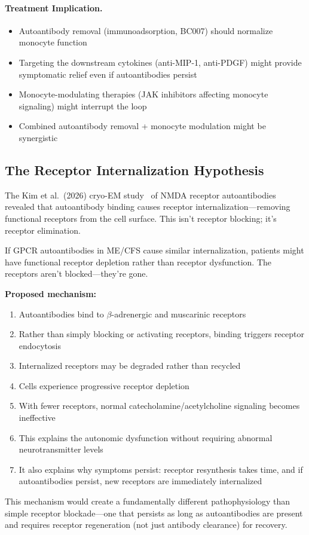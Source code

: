 \paragraph{Treatment Implication.}
\begin{itemize}
    \item Autoantibody removal (immunoadsorption, BC007) should normalize monocyte function
    \item Targeting the downstream cytokines (anti-MIP-1, anti-PDGF) might provide symptomatic relief even if autoantibodies persist
    \item Monocyte-modulating therapies (JAK inhibitors affecting monocyte signaling) might interrupt the loop
    \item Combined autoantibody removal + monocyte modulation might be synergistic
\end{itemize}

\subsection{The Receptor Internalization Hypothesis}

\begin{open_question}
The Kim et al.\ (2026) cryo-EM study~\cite{Kim2026nmdar_cryoem} of NMDA receptor autoantibodies revealed that autoantibody binding causes receptor internalization---removing functional receptors from the cell surface. This isn't receptor blocking; it's receptor elimination.

If GPCR autoantibodies in ME/CFS cause similar internalization, patients might have functional receptor depletion rather than receptor dysfunction. The receptors aren't blocked---they're gone.

\textbf{Proposed mechanism:}
\begin{enumerate}
    \item Autoantibodies bind to $\beta$-adrenergic and muscarinic receptors
    \item Rather than simply blocking or activating receptors, binding triggers receptor endocytosis
    \item Internalized receptors may be degraded rather than recycled
    \item Cells experience progressive receptor depletion
    \item With fewer receptors, normal catecholamine/acetylcholine signaling becomes ineffective
    \item This explains the autonomic dysfunction without requiring abnormal neurotransmitter levels
    \item It also explains why symptoms persist: receptor resynthesis takes time, and if autoantibodies persist, new receptors are immediately internalized
\end{enumerate}

This mechanism would create a fundamentally different pathophysiology than simple receptor blockade---one that persists as long as autoantibodies are present and requires receptor regeneration (not just antibody clearance) for recovery.
\end{open_question}


